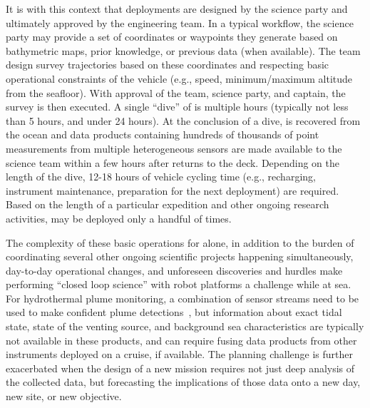It is with this context that \Sentry deployments are designed by the science party and ultimately approved by the \Sentry engineering team. In a typical workflow, the science party may provide a set of coordinates or waypoints they generate based on bathymetric maps, prior knowledge, or previous data (when available). The \Sentry team design survey trajectories based on these coordinates and respecting basic operational constraints of the vehicle (e.g., speed, minimum/maximum altitude from the seafloor). With approval of the \Sentry team, science party, and captain, the survey is then executed. A single ``dive'' of \Sentry is multiple hours (typically not less than 5 hours, and under 24 hours). At the conclusion of a dive, \Sentry is recovered from the ocean and data products containing hundreds of thousands of point measurements from multiple heterogeneous sensors are made available to the science team within a few hours after \Sentry returns to the deck. Depending on the length of the dive, 12-18 hours of vehicle cycling time (e.g., recharging, instrument maintenance, preparation for the next deployment) are required. Based on the length of a particular expedition and other ongoing research activities, \Sentry may be deployed only a handful of times.

The complexity of these basic operations for \Sentry alone, in addition to the burden of coordinating several other ongoing scientific projects happening simultaneously, day-to-day operational changes, and unforeseen discoveries and hurdles make performing ``closed loop science'' with robot platforms a challenge while at sea. For hydrothermal plume monitoring, a combination of sensor streams need to be used to make confident plume detections~\autocite{jakuba2007stochastic}, but information about exact tidal state, state of the venting source, and background sea characteristics are typically not available in these products, and can require fusing data products from other instruments deployed on a cruise, if available. The planning challenge is further exacerbated when the design of a new mission requires not just deep analysis of the collected data, but forecasting the implications of those data onto a new day, new site, or new objective. 


